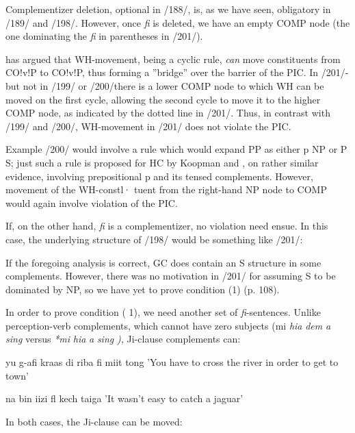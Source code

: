 Complementizer deletion, optional in /188/, is, as we have seen, obliga\-tory in /189/ and /198/. However, once \textit{fi} is deleted, we have an empty COMP node (the one dominating the \textit{fi} in parentheses in /201/).

\citet{Chomsky1977} has argued that WH-movement, being a cyclic rule, \textit{can} move constituents from CO!v!P to CO!v!P, thus forming a ''bridge'' over the barrier of the PIC. In /201/-but not in /199/ or /200/\-there is a lower COMP node to which WH can be moved on the first cycle, allowing the second cycle to move it to the higher COMP node,
as indicated by the dotted line in /201/. Thus, in contrast with /199/ and /200/, WH-movement in /201/ does not violate the PIC.

Example /200/ would involve a rule which would expand PP as either p NP or P S; just such a rule is proposed for HC by Koopman and \citet{Lefebvre1981}, on rather similar evidence, involving prepositional p and its tensed complements. However, movement of the WH-constl· tuent from the right-hand NP node to COMP would again involve
violation of the PIC.

If, on the other hand, \textit{fi} is a complementizer, no violation need
ensue. In this case, the underlying structure of /198/ would be some\-thing like /201/:


If the foregoing analysis is correct, GC does contain an S structure in some complements. However, there was no motivation in /201/ for assuming S to be dominated by NP, so we have yet to prove condi\-tion (1) (p. 108).

In order to prove condition ( 1), we need another set of \textit{fi}-sentences. Unlike perception-verb complements, which cannot have zero subjects (mi \textit{hia} \textit{dem} \textit{a} \textit{sing} versus \textit{*mi} \textit{hia} \textit{a} \textit{sing} \textit{),} Ji{}-clause comple\-ments can:

\ea\label{ex:202}
 yu g-afi kraas di riba fi miit tong
\glt 'You have to cross the river in order to get to town'
\z





\ea\label{ex:203}
 na bin iizi fl kech taiga
\glt 'It wasn't easy to catch a jaguar'
\z



In both cases, the Ji-clause can be moved:

